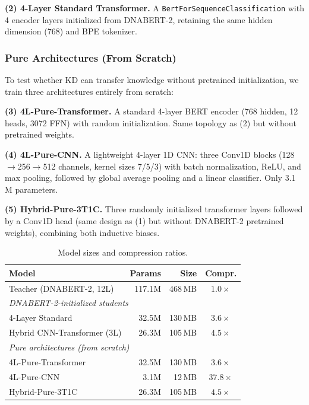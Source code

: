 \documentclass{article}
\begin{document}
\textbf{(2) 4-Layer Standard Transformer.}\quad
A \texttt{BertForSequenceClassification} with 4 encoder layers initialized from DNABERT-2, retaining the same hidden dimension (768) and BPE tokenizer.

\subsubsection{Pure Architectures (From Scratch)}

To test whether KD can transfer knowledge without pretrained initialization, we train three architectures entirely from scratch:

\textbf{(3) 4L-Pure-Transformer.}\quad
A standard 4-layer BERT encoder (768 hidden, 12 heads, 3072 FFN) with random initialization. Same topology as (2) but without pretrained weights.

\textbf{(4) 4L-Pure-CNN.}\quad
A lightweight 4-layer 1D CNN: three Conv1D blocks (128$\to$256$\to$512 channels, kernel sizes 7/5/3) with batch normalization, ReLU, and max pooling, followed by global average pooling and a linear classifier. Only 3.1\,M parameters.

\textbf{(5) Hybrid-Pure-3T1C.}\quad
Three randomly initialized transformer layers followed by a Conv1D head (same design as (1) but without DNABERT-2 pretrained weights), combining both inductive biases.

\begin{table}[t]
\centering
\caption{Model sizes and compression ratios.}
\label{tab:sizes}
\begin{tabular}{lrrc}
\toprule
\textbf{Model} & \textbf{Params} & \textbf{Size} & \textbf{Compr.} \\
\midrule
Teacher (DNABERT-2, 12L) & 117.1M & 468\,MB & $1.0\times$ \\
\midrule
\multicolumn{4}{l}{\emph{DNABERT-2-initialized students}} \\
4-Layer Standard & 32.5M & 130\,MB & $3.6\times$ \\
Hybrid CNN-Transformer (3L) & 26.3M & 105\,MB & $4.5\times$ \\
\midrule
\multicolumn{4}{l}{\emph{Pure architectures (from scratch)}} \\
4L-Pure-Transformer & 32.5M & 130\,MB & $3.6\times$ \\
4L-Pure-CNN & 3.1M & 12\,MB & $37.8\times$ \\
Hybrid-Pure-3T1C & 26.3M & 105\,MB & $4.5\times$ \\
\bottomrule
\end{tabular}
\end{table}
\end{document}
